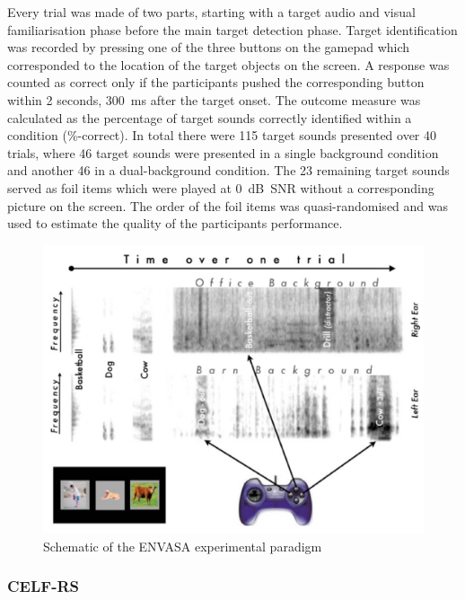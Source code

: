 \documentclass[a4paper, twoside]{templates/ociamthesis}
\begin{document}
Every trial was made of two parts, starting with a target audio and visual familiarisation phase before the main target detection phase. Target identification was recorded by pressing one of the three buttons on the gamepad which corresponded to the location of the target objects on the screen. A response was counted as correct only if the participants pushed the corresponding button within 2 seconds, 300~ms after the target onset. The outcome measure was calculated as the percentage of target sounds correctly identified within a condition (\%-correct). In total there were 115 target sounds presented over 40 trials, where 46 target sounds were presented in a single background condition and another 46 in a dual-background condition. The 23 remaining target sounds served as foil items which were played at 0~dB~SNR without a corresponding picture on the screen. The order of the foil items was quasi-randomised and was used to estimate the quality of the participants performance.



\begin{figure}

{\centering \includegraphics[width=0.65\linewidth]{figures/ENVASAparadigm} 

}

\caption{Schematic of the ENVASA experimental paradigm \autocite[taken from][]{Leech2009}}\label{fig:ENVASA}
\end{figure}

\hypertarget{celf-rs}{%
\subsubsection{CELF-RS}\label{celf-rs}}
\end{document}
